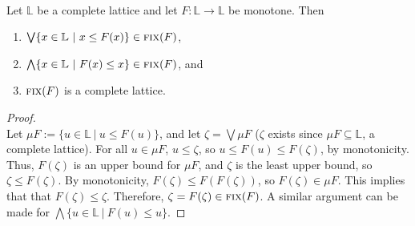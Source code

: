 \begin{thm}\label{thm:tarski}
    ~\\
    Let $\mathbb{L}$ be a complete lattice and let $F: \mathbb{L} \to \mathbb{L}$ be monotone. Then
    \begin{enumerate}
    \item $\bigvee \{ x \in \mathbb{L} \ \vert \ x \leq F(x) \} \in \textsc{fix}(F)$,
    \item $\bigwedge \{ x \in \mathbb{L} \ \vert \ F(x) \leq x \} \in \textsc{fix}(F)$, and
    \item $\textsc{fix}(F)$ is a complete lattice.
    \end{enumerate}
\end{thm}

\begin{proof}~\\
    Let $\mu F := \{ u \in \mathbb{L} \ \vert \ u \leq F(u) \}$, and
    let $\zeta = \bigvee \mu F$ ($\zeta$ exists since $\mu F \subseteq \mathbb{L}$, a complete lattice).
    For all $u \in \mu F$, $u \leq \zeta$, so $u \leq F(u) \leq F(\zeta)$, by monotonicity.
    Thus, $F(\zeta)$ is an upper bound for $\mu F$, and $\zeta$ is the least upper bound, so $\zeta \leq F(\zeta)$.
    By monotonicity, $F(\zeta) \leq F(F(\zeta))$, so $F(\zeta) \in \mu F$. This implies that that $F(\zeta) \leq \zeta$.
    Therefore, $\zeta = F(\zeta) \in \textsc{fix}(F)$.
    A similar argument can be made for $\bigwedge \{ u \in \mathbb{L} \ \vert \ F(u) \leq u \}$.


\end{proof}
